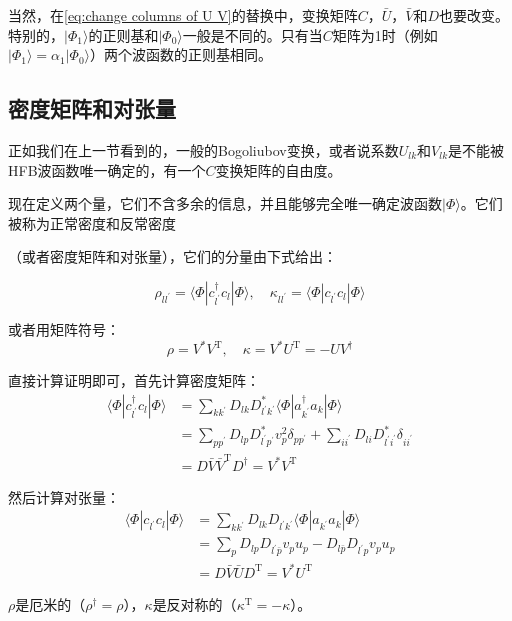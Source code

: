 当然，在\ref{eq:change columns of U V}的替换中，变换矩阵$C$，$\bar{U}$，$\bar{V}$和$D$也要改变。特别的，$|\Phi_{1}\rangle$的正则基和$|\Phi_{0}\rangle$一般是不同的。只有当$C$矩阵为1时（例如$|\Phi_{1}\rangle=\alpha_{1}|\Phi_{0}\rangle$）两个波函数的正则基相同。

\subsection{密度矩阵和对张量}

正如我们在上一节看到的，一般的Bogoliubov变换，或者说系数$U_{lk}$和$V_{lk}$是不能被HFB波函数唯一确定的，有一个$C$变换矩阵的自由度。

现在定义两个量，它们不含多余的信息，并且能够完全唯一确定波函数$|\Phi\rangle$。它们被称为正常密度和反常密度

（或者密度矩阵和对张量），它们的分量由下式给出：

\begin{equation}
\rho_{ll^{\prime}}=\langle\Phi|c^{\dagger}_{l^{\prime}}c_{l}|\Phi\rangle,\quad\kappa_{ll^{\prime}}=\langle\Phi|c_{l^{\prime}}c_{l}|\Phi\rangle\label{eq:=005355=007C92=005B50=005BC6=005EA6=0077E9=009635}
\end{equation}

或者用矩阵符号：
\[
\rho=V^{*}V^{\mathrm{T}},\quad\kappa=V^{*}U^{\mathrm{T}}=-UV^{\dagger}
\]

\begin{booknote*}
直接计算证明即可，首先计算密度矩阵：
\begin{align*}
\langle\Phi|c^{\dagger}_{l^{\prime}}c_{l}|\Phi\rangle & =\sum_{kk^{\prime}}D_{lk}D^{*}_{l^{\prime}k^{\prime}}\langle\Phi|a^{\dagger}_{k^{\prime}}a_{k}|\Phi\rangle\\
 & =\sum_{pp^{\prime}}D_{lp}D^{*}_{l^{\prime}p^{\prime}}v^{2}_{p}\delta_{pp^{\prime}}+\sum_{ii^{\prime}}D_{li}D^{*}_{l^{\prime}i^{\prime}}\delta_{ii^{\prime}}\\
 & =D\bar{V}\bar{V}^{\mathrm{T}}D^{\dagger}=V^{*}V^{\mathrm{T}}
\end{align*}

然后计算对张量：
\begin{align*}
\langle\Phi|c_{l^{\prime}}c_{l}|\Phi\rangle & =\sum_{kk^{\prime}}D_{lk}D_{l^{\prime}k^{\prime}}\langle\Phi|a_{k^{\prime}}a_{k}|\Phi\rangle\\
 & =\sum_{p}D_{lp}D_{l^{\prime}\bar{p}}v_{p}u_{p}-D_{l\bar{p}}D_{l^{\prime}p}v_{p}u_{p}\\
 & =D\bar{V}\bar{U}D^{\mathrm{T}}=V^{*}U^{\mathrm{T}}
\end{align*}
\end{booknote*}
$\rho$是厄米的（$\rho^{\dagger}=\rho$），$\kappa$是反对称的（$\kappa^{\mathrm{T}}=-\kappa$）。

